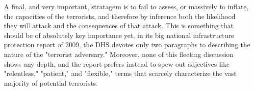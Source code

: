 A final, and very important, stratagem is to fail to assess, or massively to inflate, the capacities of the terrorists, and therefore by inference both the likelihood they will attack and the consequences of that attack. This is something that should be of absolutely key importance yet, in its big national infrastructure protection report of 2009, the DHS devotes only two paragraphs to describing the nature of the "terrorist adversary." Moreover, none of this fleeting discussion shows any depth, and the report prefers instead to spew out adjectives like "relentless," "patient," and "flexible," terms that scarcely characterize the vast majority of potential terrorists.
